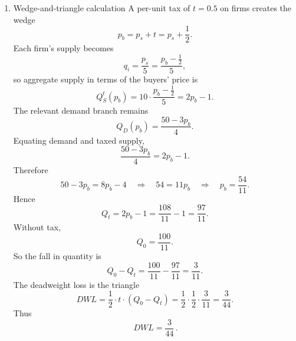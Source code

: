 \documentclass[12pt]{article}
\begin{document}
\begin{enumerate}[label=(\alph*)]
Now compute each consumer's demand at the equilibrium price.

For Consumer 1,
\[
q_1^*=\frac{20-p^*}{4}
=\frac{20-\frac{50}{11}}{4}
=\frac{85}{22}.
\]
For Consumer 2,
\[
q_2^*=\frac{15-p^*}{2}
=\frac{15-\frac{50}{11}}{2}
=\frac{115}{22}.
\]
Their consumer surpluses are:
\[
CS_1=\frac{1}{2}q_1^*(20-p^*)
=\frac{1}{2}\cdot \frac{85}{22}\cdot \frac{170}{11}
=\frac{7225}{242},
\]
\[
CS_2=\frac{1}{2}q_2^*(15-p^*)
=\frac{1}{2}\cdot \frac{115}{22}\cdot \frac{115}{11}
=\frac{13225}{484}.
\]
So total consumer surplus is
\[
CS=CS_1+CS_2=\frac{7225}{242}+\frac{13225}{484}
=\frac{27675}{484}.
\]

Each firm's output is
\[
q_i^*=\frac{p^*}{5}=\frac{10}{11}.
\]
Each firm has a linear inverse supply through the origin, so producer surplus per firm is
\[
PS_i=\frac{1}{2}q_i^*p^*
=\frac{1}{2}\cdot \frac{10}{11}\cdot \frac{50}{11}
=\frac{250}{121}.
\]
With 10 firms,
\[
PS=10PS_i=\frac{2500}{121}.
\]

Therefore
\[
\boxed{\,CS=\frac{27675}{484},\qquad PS=\frac{2500}{121}\,.}
\]


    \item Wedge-and-triangle calculation
A per-unit tax of \(t=0.5\) on firms creates the wedge
\[
p_b=p_s+t=p_s+\frac{1}{2}.
\]
Each firm's supply becomes
\[
q_i=\frac{p_s}{5}=\frac{p_b-\frac{1}{2}}{5},
\]
so aggregate supply in terms of the buyers' price is
\[
Q_S^t(p_b)=10\cdot \frac{p_b-\frac{1}{2}}{5}=2p_b-1.
\]
The relevant demand branch remains
\[
Q_D(p_b)=\frac{50-3p_b}{4}.
\]
Equating demand and taxed supply,
\[
\frac{50-3p_b}{4}=2p_b-1.
\]
Therefore
\[
50-3p_b=8p_b-4
\quad\Longrightarrow\quad
54=11p_b
\quad\Longrightarrow\quad
p_b=\frac{54}{11}.
\]
Hence
\[
Q_t=2p_b-1=\frac{108}{11}-1=\frac{97}{11}.
\]
Without tax,
\[
Q_0=\frac{100}{11}.
\]
So the fall in quantity is
\[
Q_0-Q_t=\frac{100}{11}-\frac{97}{11}=\frac{3}{11}.
\]
The deadweight loss is the triangle
\[
DWL=\frac{1}{2}\cdot t \cdot (Q_0-Q_t)
=\frac{1}{2}\cdot \frac{1}{2}\cdot \frac{3}{11}
=\frac{3}{44}.
\]
Thus
\[
\boxed{\,DWL=\frac{3}{44}\,.}
\]
\end{enumerate}

\newpage
\end{document}
